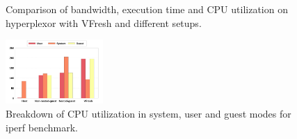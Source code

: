 \begin{figure}
	\centering
		\hspace{0.1in}
		\hspace{0.1in}
		\vspace{-0.1in}
	\caption{Comparison of bandwidth, execution time and CPU utilization on hyperplexor with VFresh and different setups.}
	\vspace{-0.05in}
	\label{fig:impl}
\end{figure}

\begin{figure}[t!]
  \includegraphics[width=0.33\textwidth]{figures/cpu_util_iperf.pdf}
  \caption{Breakdown of CPU utilization in system, user and guest modes for iperf benchmark.}
  \label{fig:cpuut}
\end{figure}

